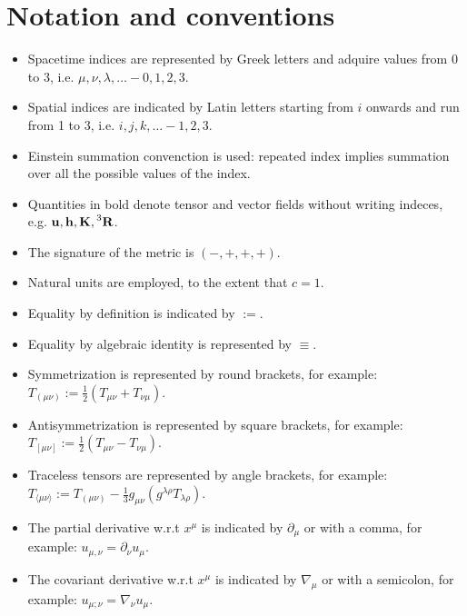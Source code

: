 \section{Notation and conventions}
\begin{itemize}
    \item Spacetime indices are represented by Greek letters and adquire values from 0 to 3, i.e. $\mu,\nu,\lambda,\ldots - 0,1,2,3$.
    \item Spatial indices are indicated by Latin letters starting from $i$ onwards and run from 1 to 3, i.e. $i,j,k,\ldots - 1,2,3$.
    \item Einstein summation convenction is used: repeated index implies summation over all the possible values of the index.
    \item Quantities in bold denote tensor and vector fields without writing indeces, e.g. $\mathbf{u},\mathbf{h},\mathbf{K},\prescript{3}{}{\mathbf{R}}$.
    \item The signature of the metric is $(-,+,+,+)$.
    \item Natural units are employed, to the extent that $c=1$.
    \item Equality by definition is indicated by $:=$.
    \item Equality by algebraic identity is represented by $\equiv$.
    \item Symmetrization is represented by round brackets, for example: $T_{(\mu\nu)}:=\frac{1}{2}(T_{\mu\nu}+T_{\nu\mu})$.
    \item Antisymmetrization is represented by square brackets, for example: $T_{[\mu\nu]}:=\frac{1}{2}(T_{\mu\nu}-T_{\nu\mu})$.
    \item Traceless tensors are represented by angle brackets, for example: $T_{\langle\mu\nu\rangle}:=T_{(\mu\nu)}-\frac{1}{3}g_{\mu\nu}(g^{\lambda\rho}T_{\lambda\rho})$.
    \item The partial derivative w.r.t $x^\mu$ is indicated by $\partial_\mu$ or with a comma, for example: $u_{\mu,\nu}=\partial_\nu u_\mu$.
    \item The covariant derivative w.r.t $x^\mu$ is indicated by $\nabla_\mu$ or with a semicolon, for example: $u_{\mu;\nu}=\nabla_\nu u_\mu$.
\end{itemize}